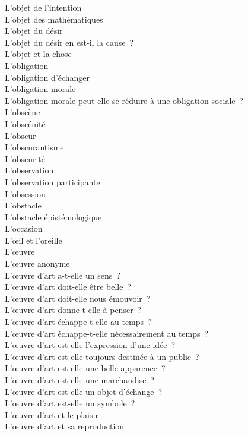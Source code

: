 \documentclass[a4paper,12pt]{article}
\begin{document}
L'objet de l'intention \\
L'objet des mathématiques \\
L'objet du désir \\
L'objet du désir en est-il la cause ? \\
L'objet et la chose \\
L'obligation \\
L'obligation d'échanger \\
L'obligation morale \\
L'obligation morale peut-elle se réduire à une obligation sociale ? \\
L'obscène \\
L'obscénité \\
L'obscur \\
L'obscurantisme \\
L'obscurité \\
L'observation \\
L'observation participante \\
L'obsession \\
L'obstacle \\
L'obstacle épistémologique \\
L'occasion \\
L'œil et l'oreille \\
L'œuvre \\
L'œuvre anonyme \\
L'œuvre d'art a-t-elle un sens ? \\
L'œuvre d'art doit-elle être belle ? \\
L'œuvre d'art doit-elle nous émouvoir ? \\
L'œuvre d'art donne-t-elle à penser ? \\
L'œuvre d'art échappe-t-elle au temps ? \\
L'œuvre d'art échappe-t-elle nécessairement au temps ? \\
L'œuvre d'art est-elle l'expression d'une idée ? \\
L'œuvre d'art est-elle toujours destinée à un public ? \\
L'œuvre d'art est-elle une belle apparence ? \\
L'œuvre d'art est-elle une marchandise ? \\
L'œuvre d'art est-elle un objet d'échange ? \\
L'œuvre d'art est-elle un symbole ? \\
L'œuvre d'art et le plaisir \\
L'œuvre d'art et sa reproduction \\
\end{document}
